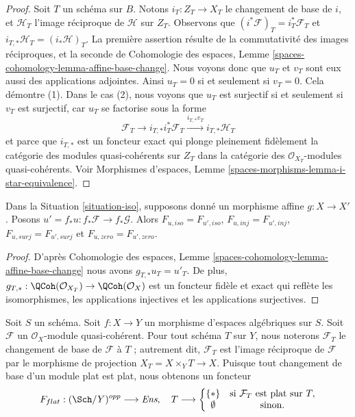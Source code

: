 \begin{proof}
Soit $T$ un schéma sur $B$. Notons $i_T : Z_T \to X_T$
le changement de base de $i$, et $\mathcal{H}_T$ l'image réciproque de $\mathcal{H}$
sur $Z_T$. Observons que $(i^*\mathcal{F})_T = i_T^*\mathcal{F}_T$
et $i_{T, *}\mathcal{H}_T = (i_*\mathcal{H})_T$.
La première assertion résulte de la commutativité des images réciproques,
et la seconde de Cohomologie des espaces, Lemme
\ref{spaces-cohomology-lemma-affine-base-change}.
Nous voyons donc que $u_T$ et $v_T$ sont eux aussi des applications adjointes.
Ainsi $u_T = 0$ si et seulement si $v_T = 0$. Cela démontre (1).
Dans le cas (2), nous voyons que $u_T$ est surjectif si et seulement si
$v_T$ est surjectif, car $u_T$ se factorise sous la forme
$$
\mathcal{F}_T \to
i_{T, *}i_T^*\mathcal{F}_T \xrightarrow{i_{T, *}v_T} i_{T, *}\mathcal{H}_T
$$
et parce que $i_{T, *}$ est un foncteur exact
qui plonge pleinement fidèlement la catégorie des modules quasi-cohérents sur
$Z_T$ dans la catégorie des $\mathcal{O}_{X_T}$-modules quasi-cohérents.
Voir Morphismes d'espaces, Lemme \ref{spaces-morphisms-lemma-i-star-equivalence}.
\end{proof}

\begin{lemma}
\label{lemma-relate-zero-affine-push}
Dans la Situation \ref{situation-iso}, supposons donné un morphisme affine
$g : X \to X'$. Posons $u' = f_*u : f_*\mathcal{F} \to f_*\mathcal{G}$.
Alors $F_{u, iso} = F_{u', iso}$, $F_{u, inj} = F_{u', inj}$,
$F_{u, surj} = F_{u', surj}$ et $F_{u, zero} = F_{u', zero}$.
\end{lemma}

\begin{proof}
D'après Cohomologie des espaces, Lemme
\ref{spaces-cohomology-lemma-affine-base-change}
nous avons $g_{T, *}u_T = u'_T$.
De plus, $g_{T, *} : \QCoh(\mathcal{O}_{X_T}) \to \QCoh(\mathcal{O}_X)$
est un foncteur fidèle et exact qui reflète les isomorphismes, les applications
injectives et les applications surjectives.
\end{proof}

\begin{situation}
\label{situation-flat}
Soit $S$ un schéma.
Soit $f : X \to Y$ un morphisme d'espaces algébriques sur $S$.
Soit $\mathcal{F}$ un $\mathcal{O}_X$-module quasi-cohérent.
Pour tout schéma $T$ sur $Y$, nous noterons $\mathcal{F}_T$ le
changement de base de $\mathcal{F}$ à $T$ ; autrement dit, $\mathcal{F}_T$
est l'image réciproque de $\mathcal{F}$ par le morphisme de projection
$X_T = X \times_Y T \to X$. Puisque tout changement de base d'un module plat
est plat, nous obtenons un foncteur
\begin{equation}
\label{equation-flat}
F_{flat} : (\Sch/Y)^{opp} \longrightarrow \textit{Ens}, \quad
T \longrightarrow \left\{
\begin{matrix}
\{*\} & \text{si } \mathcal{F}_T \text{ est plat sur }T, \\
\emptyset & \text{sinon.}
\end{matrix}
\right.
\end{equation}
\end{situation}

